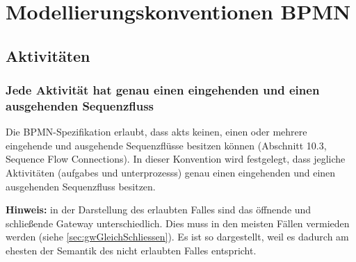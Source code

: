 \documentclass[12pt,report]{../../Templates/snetTeaching}
\begin{document}
\chapter{Modellierungskonventionen BPMN}


\section{Aktivitäten}


\subsection{Jede Aktivität hat genau einen eingehenden und einen ausgehenden Sequenzfluss}
\label{konv:oneSeqenceFlow}

Die BPMN-Spezifikation erlaubt, dass \glspl{akt} keinen, einen oder mehrere eingehende und ausgehende Sequenzflüsse besitzen können (Abschnitt 10.3, Sequence Flow Connections). In dieser Konvention wird festgelegt, dass jegliche Aktivitäten (\glspl{aufgabe} und \glspl{unterprozess}) genau einen eingehenden und einen ausgehenden Sequenzfluss besitzen.


\begin{Rahmen}
	\hfill
\end{Rahmen}

\textbf{Hinweis:}
in der Darstellung des erlaubten Falles sind das öffnende und schließende Gateway unterschiedlich. Dies muss in den meisten Fällen vermieden werden (siehe \ref{sec:gwGleichSchliessen}). Es ist so dargestellt, weil es dadurch am ehesten der Semantik des nicht erlaubten Falles entspricht.
\end{document}
